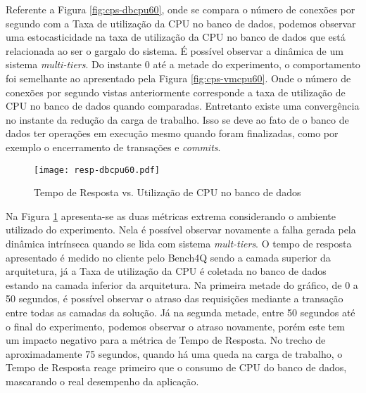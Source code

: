 Referente a Figura \ref{fig:cps-dbcpu60}, onde se compara o número de conexões por segundo com a Taxa de utilização da CPU no banco de dados, podemos observar uma estocasticidade na taxa de utilização da CPU no banco de dados que está relacionada ao ser o gargalo do sistema. É possível observar a dinâmica de um sistema \textit{multi-tiers}. Do instante 0 até a metade do experimento, o comportamento foi semelhante ao apresentado pela Figura \ref{fig:cps-vmcpu60}. Onde o número de conexões por segundo vistas anteriormente corresponde a taxa de utilização de CPU no banco de dados quando comparadas. Entretanto existe uma convergência no instante da redução da carga de trabalho. Isso se deve ao fato de o banco de dados ter operações em execução mesmo quando foram finalizadas, como por exemplo o encerramento de transações e \textit{commits}. 

\begin{figure}[htb]
	\centering
	\texttt{[image: resp-dbcpu60.pdf]}
	\caption{Tempo de Resposta vs. Utilização de CPU no banco de dados}
	\label{fig:resp-dbcpu60}
	\fdadospesquisa
\end{figure}

Na Figura \ref{fig:resp-dbcpu60} apresenta-se as duas métricas extrema considerando o ambiente utilizado do experimento. Nela é possível observar novamente a falha gerada pela dinâmica intrínseca quando se lida com sistema \textit{mult-tiers}. O tempo de resposta apresentado é medido no cliente pelo Bench4Q sendo a camada superior da arquitetura, já a Taxa de utilização da CPU é coletada no banco de dados estando na camada inferior da arquitetura. Na primeira metade do gráfico, de 0 a 50 segundos, é possível observar o atraso das requisições mediante a transação entre todas as camadas da solução. Já na segunda metade, entre 50 segundos até o final do experimento, podemos observar o atraso novamente, porém este tem um impacto negativo para a métrica de Tempo de Resposta. No trecho de aproximadamente 75 segundos, quando há uma queda na carga de trabalho, o Tempo de Resposta reage primeiro que o consumo de CPU do banco de dados, mascarando o real desempenho da aplicação.
